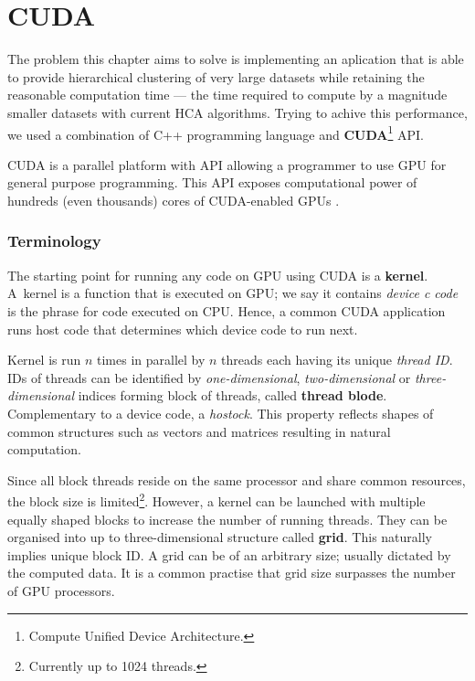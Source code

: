 \chapter{CUDA}

The problem this chapter aims to solve is implementing an aplication that is able to provide hierarchical clustering of very large datasets while retaining the reasonable computation time --- the time required to compute by a magnitude smaller datasets with current HCA algorithms.
Trying to achive this performance, we used a combination of C++ programming language and \textbf{CUDA}\footnote{Compute Unified Device Architecture.} API.

CUDA is a parallel platform with API allowing a programmer to use GPU for general purpose programming. This API exposes computational power of hundreds (even thousands) cores of CUDA-enabled GPUs \cite{cuda}.


\subsection{Terminology}

The starting point for running any code on GPU using CUDA is a \textbf{kernel}. A~kernel is a function that is executed on GPU; we say it contains \emph{device c code} is the phrase for code executed on CPU. Hence, a common CUDA application runs host code that determines which device code to run next. 

Kernel is run $n$ times in parallel by $n$ threads each having its unique \emph{thread ID}. IDs of threads can be identified by \emph{one-dimensional}, \emph{two-dimensional} or \emph{three-dimensional} indices forming block of threads, called \textbf{thread blode}. Complementary to a device code, a \emph{hostock}. This property reflects shapes of common structures such as vectors and matrices resulting in natural computation.

Since all block threads reside on the same processor and share common resources, the block size is limited\footnote{Currently up to 1024 threads.}. However, a kernel can be launched with multiple equally shaped blocks to increase the number of running threads. They can be organised into up to three-dimensional structure called \textbf{grid}. This naturally implies unique block ID. A grid can be of an arbitrary size; usually dictated by the computed data. It is a common practise that grid size surpasses the number of GPU processors.


